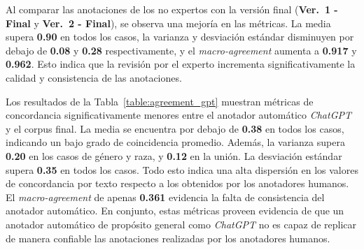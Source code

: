 Al comparar las anotaciones de los no expertos con la versi\'on final (\textbf{Ver.~1 - Final} y \textbf{Ver.~2 - Final}), se
observa una mejor\'ia en las m\'etricas. La media supera \textbf{0.90} en todos los casos, la varianza y desviaci\'on est\'andar
disminuyen por debajo de \textbf{0.08} y \textbf{0.28} respectivamente, y el \emph{macro-agreement} aumenta a \textbf{0.917} y 
\textbf{0.962}. Esto indica que la revisi\'on por el experto incrementa significativamente la calidad y consistencia de las 
anotaciones.

Los resultados de la Tabla~\ref{table:agreement_gpt} muestran m\'etricas de concordancia significativamente menores entre 
el anotador autom\'atico \emph{ChatGPT} y el corpus final. La media se encuentra por debajo de \textbf{0.38} en todos los casos,
indicando un bajo grado de coincidencia promedio. Adem\'as, la varianza supera \textbf{0.20} en los casos de g\'enero y raza, y 
\textbf{0.12} en la uni\'on. La desviaci\'on est\'andar supera \textbf{0.35} en todos los casos. Todo esto indica una alta 
dispersi\'on en los valores de concordancia por texto respecto a los obtenidos por los anotadores humanos. El 
\emph{macro-agreement} de apenas \textbf{0.361} evidencia la falta de consistencia del anotador autom\'atico. En conjunto, estas
m\'etricas proveen evidencia de que un anotador autom\'atico de prop\'osito general como \emph{ChatGPT} no es capaz de replicar
de manera confiable las anotaciones realizadas por los anotadores humanos.  
